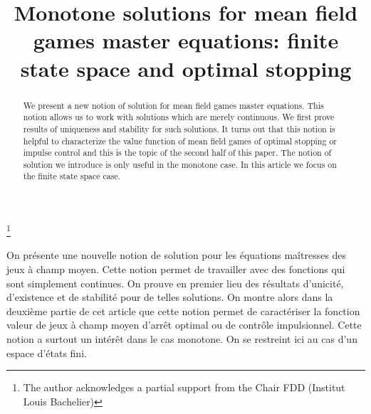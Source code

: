\documentclass[JEP,XML,SOM,Unicode,NoEqCountersInSection,published]{cedram}
\theoremstyle{definition}
\begin{document}
\title[Monotone solutions for mean field games master equations]{Monotone solutions for mean field games master equations: finite state space and optimal stopping}

\author[\initial{C.} \lastname{Bertucci}]{ }
\address{CMAP, UMR 7641, CNRS, Ecole Polytechnique\\
91120 Palaiseau, France}

\thanks{The author acknowledges a partial support from the Chair FDD (Institut Louis Bachelier)}

\begin{abstract}
We present a new notion of solution for mean field games master equations. This notion allows us to work with solutions which are merely continuous. We first prove results of uniqueness and stability for such solutions. It turns out that this notion is helpful to characterize the value function of mean field games of optimal stopping or impulse control and this is the topic of the second half of this paper. The notion of solution we introduce is only useful in the monotone case. In this article we focus on the finite state space case.
\end{abstract}





\begin{altabstract}
On présente une nouvelle notion de solution pour les équations maîtresses des jeux à champ moyen. Cette notion permet de travailler avec des fonctions qui sont simplement continues. On prouve en premier lieu des résultats d'unicité, d'existence et de stabilité pour de telles solutions. On montre alors dans la deuxième partie de cet article que cette notion permet de caractériser la fonction valeur de jeux à champ moyen d'arrêt optimal ou de contrôle impulsionnel. Cette notion a surtout un intérêt dans le cas monotone. On se restreint ici au cas d'un espace d'états fini.
\end{altabstract}

\maketitle
\vspace*{-.5\baselineskip}
\tableofcontents
\end{document}
